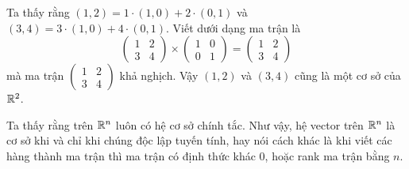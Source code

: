 Ta thấy rằng $(1, 2) = 1 \cdot (1, 0) + 2 \cdot (0, 1)$
và $(3, 4) = 3 \cdot (1, 0) + 4 \cdot (0, 1)$. Viết dưới 
dạng ma trận là
\[
    \begin{pmatrix} 1 & 2 \\ 3 & 4 \end{pmatrix}
    \times \begin{pmatrix} 1 & 0 \\ 0 & 1 \end{pmatrix}
    = \begin{pmatrix} 1 & 2 \\ 3 & 4 \end{pmatrix}
\]
mà ma trận $\begin{pmatrix} 1 & 2 \\ 3 & 4 \end{pmatrix}$
khả nghịch. Vậy $(1, 2)$ và $(3, 4)$ cũng là một cơ sở của $\mathbb{R}^2$.

\begin{remark}
    Ta thấy rằng trên $\mathbb{R}^n$ luôn có hệ cơ sở chính tắc.
    Như vậy, hệ vector trên $\mathbb{R}^n$ là cơ sở khi và chỉ khi 
    chúng độc lập tuyến tính, hay nói cách khác là khi viết 
    các hàng thành ma trận thì ma trận có định thức khác 0,
    hoặc rank ma trận bằng $n$.
\end{remark}

